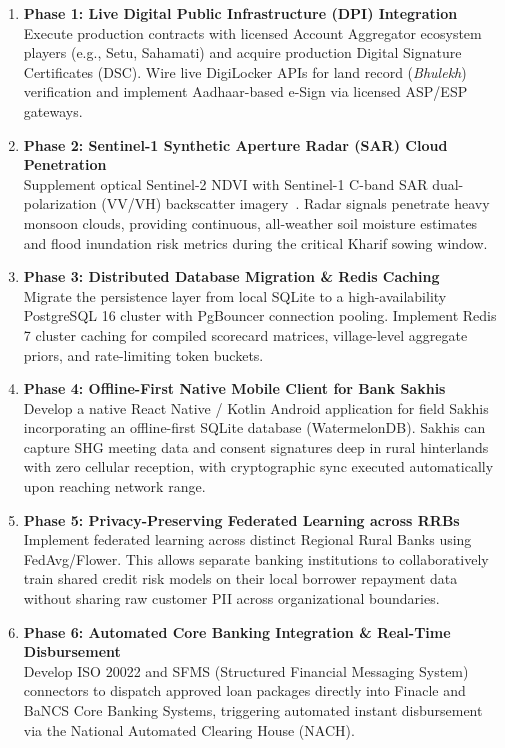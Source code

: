 \begin{enumerate}
  \item \textbf{Phase 1: Live Digital Public Infrastructure (DPI) Integration}\\
  Execute production contracts with licensed Account Aggregator ecosystem players (e.g., Setu, Sahamati) and acquire production Digital Signature Certificates (DSC). Wire live DigiLocker APIs for land record (\textit{Bhulekh}) verification and implement Aadhaar-based e-Sign via licensed ASP/ESP gateways.

  \item \textbf{Phase 2: Sentinel-1 Synthetic Aperture Radar (SAR) Cloud Penetration}\\
  Supplement optical Sentinel-2 NDVI with Sentinel-1 C-band SAR dual-polarization (VV/VH) backscatter imagery~\cite{drusch_sentinel2_2012}. Radar signals penetrate heavy monsoon clouds, providing continuous, all-weather soil moisture estimates and flood inundation risk metrics during the critical Kharif sowing window.

  \item \textbf{Phase 3: Distributed Database Migration \& Redis Caching}\\
  Migrate the persistence layer from local SQLite to a high-availability PostgreSQL 16 cluster with PgBouncer connection pooling. Implement Redis 7 cluster caching for compiled scorecard matrices, village-level aggregate priors, and rate-limiting token buckets.

  \item \textbf{Phase 4: Offline-First Native Mobile Client for Bank Sakhis}\\
  Develop a native React Native / Kotlin Android application for field Sakhis incorporating an offline-first SQLite database (WatermelonDB). Sakhis can capture SHG meeting data and consent signatures deep in rural hinterlands with zero cellular reception, with cryptographic sync executed automatically upon reaching network range.

  \item \textbf{Phase 5: Privacy-Preserving Federated Learning across RRBs}\\
  Implement federated learning across distinct Regional Rural Banks using FedAvg/Flower. This allows separate banking institutions to collaboratively train shared credit risk models on their local borrower repayment data without sharing raw customer PII across organizational boundaries.

  \item \textbf{Phase 6: Automated Core Banking Integration \& Real-Time Disbursement}\\
  Develop ISO 20022 and SFMS (Structured Financial Messaging System) connectors to dispatch approved loan packages directly into Finacle and BaNCS Core Banking Systems, triggering automated instant disbursement via the National Automated Clearing House (NACH).
\end{enumerate}
